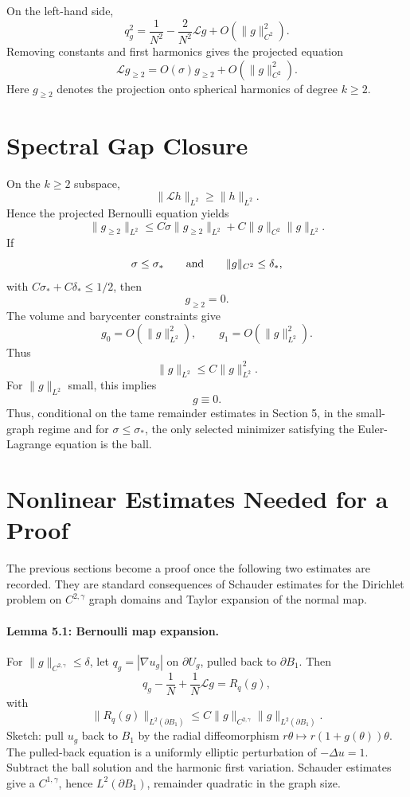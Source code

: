 \documentclass[11pt]{article}
\begin{document}
On the left-hand side,
\[
q_g^2
=
\frac1{N^2}
-\frac{2}{N^2}\mathcal L g
+O(\|g\|_{C^2}^2).
\]
Removing constants and first harmonics gives the projected equation
\[
\boxed{
\mathcal L g_{\ge2}
=
O(\sigma)g_{\ge2}
+O(\|g\|_{C^2}^2).
}
\]
Here \(g_{\ge2}\) denotes the projection onto spherical harmonics of degree
\(k\ge2\).

\section{Spectral Gap Closure}

On the \(k\ge2\) subspace,
\[
\|\mathcal L h\|_{L^2}\ge \|h\|_{L^2}.
\]
Hence the projected Bernoulli equation yields
\[
\|g_{\ge2}\|_{L^2}
\le
C\sigma\|g_{\ge2}\|_{L^2}
+C\|g\|_{C^2}\|g\|_{L^2}.
\]
If
\[
\sigma\le\sigma_*
\qquad\hbox{and}\qquad
\|g\|_{C^2}\le\delta_*,
\]
with \(C\sigma_*+C\delta_*\le1/2\), then
\[
g_{\ge2}=0.
\]
The volume and barycenter constraints give
\[
g_0=O(\|g\|_{L^2}^2),
\qquad
g_1=O(\|g\|_{L^2}^2).
\]
Thus
\[
\|g\|_{L^2}\le C\|g\|_{L^2}^2.
\]
For \(\|g\|_{L^2}\) small, this implies
\[
g\equiv0.
\]
Thus, conditional on the tame remainder estimates in Section 5, in the
small-graph regime and for \(\sigma\le\sigma_*\), the only selected minimizer
satisfying the Euler-Lagrange equation is the ball.

\section{Nonlinear Estimates Needed for a Proof}

The previous sections become a proof once the following two estimates are
recorded. They are standard consequences of Schauder estimates for the
Dirichlet problem on \(C^{2,\gamma}\) graph domains and Taylor expansion of the
normal map.

\paragraph{Lemma 5.1: Bernoulli map expansion.}
For \(\|g\|_{C^{2,\gamma}}\le\delta\), let \(q_g=|\nabla u_g|\) on
\(\partial U_g\), pulled back to \(\partial B_1\). Then
\[
q_g-\frac1N+\frac1N\mathcal L g=R_q(g),
\]
with
\[
\|R_q(g)\|_{L^2(\partial B_1)}
\le
C\|g\|_{C^{2,\gamma}}\|g\|_{L^2(\partial B_1)}.
\]
Sketch: pull \(u_g\) back to \(B_1\) by the radial diffeomorphism
\(r\theta\mapsto r(1+g(\theta))\theta\). The pulled-back equation is a uniformly
elliptic perturbation of \(-\Delta u=1\). Subtract the ball solution and the
harmonic first variation. Schauder estimates give a \(C^{1,\gamma}\), hence
\(L^2(\partial B_1)\), remainder quadratic in the graph size.
\end{document}

